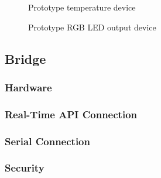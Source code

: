       \begin{figure}
        \centering
        \caption{Prototype temperature device}\label{figure:temp-device}
      \end{figure}

      \begin{figure}
        \centering
        \caption{Prototype RGB LED output device}\label{figure:led-device}
      \end{figure}

    \subsection{Bridge}
      \subsubsection{Hardware}
      \subsubsection{Real-Time API Connection}
      \subsubsection{Serial Connection}
      \subsubsection{Security}
